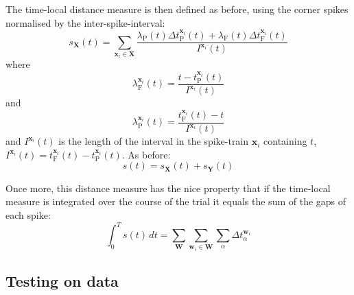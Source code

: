The time-local distance measure is then defined as before, using the corner spikes normalised by the inter-spike-interval:
\begin{equation}
s_{\mathbf{X}}(t) = \sum_{\mathbf{x}_i \in \mathbf{X}} \frac{\lambda_{\mathrm{P}}(t)\Delta t_{\mathrm{P}}^{\mathbf{x}_i} (t) + \lambda_{\mathrm{F}}(t)\Delta t_{\mathrm{F}}^{\mathbf{x}_i}(t) }{I^{\mathbf{x}_i}(t) }%
\end{equation}
where 
\begin{equation}
\lambda_{\mathrm{F}}^{\mathbf{x}_i}(t) =\frac{ t-t_{\mathrm{P}}^{\mathbf{x}_i}(t)}{I^{\mathbf{x}_i}(t)}%
\end{equation}
and
\begin{equation}
 \lambda_{\mathrm{P}}^{\mathbf{x}_i}(t) =\frac{ t_{\mathrm{F}}^{\mathbf{x}_i}(t) - t}{I^{\mathbf{x}_i}(t)}%
\end{equation}
and $I^{\mathbf{x}_i}(t)$ is the length of the interval in the spike-train $\mathbf{x}_i$ containing $t$, $I^{\mathbf{x}_i}(t) = t_{\mathrm{F}}^{\mathbf{x}_i}(t) - t_{\mathrm{P}}^{\mathbf{x}_i}(t)$.
 As before:
\begin{equation}
s(t) = s_{\mathbf{X}}(t) + s_{\mathbf{Y}}(t)
\end{equation}

Once more, this distance measure has the nice property that if the time-local measure is integrated over the course of the trial it equals the sum of the gaps of each spike:
\begin{equation}
\int_0^T s(t)\,dt = \sum_{\mathbf{W}} \sum_{\mathbf{w}_i \in \mathbf{W}} \sum_{\alpha} \Delta t_{\alpha}^{\mathbf{w}_i}
\end{equation}
\bigskip
%
%

 \subsection{Testing on data}
% 
%

